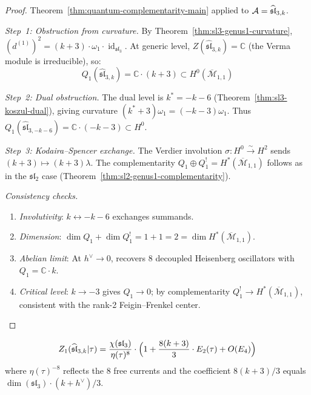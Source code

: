 \begin{proof}
Theorem~\ref{thm:quantum-complementarity-main} applied to $\mathcal{A} = \widehat{\mathfrak{sl}}_{3,k}$.

\emph{Step~1: Obstruction from curvature.}
By Theorem~\ref{thm:sl3-genus1-curvature}, $(d^{(1)})^2 = (k+3) \cdot \omega_1 \cdot \operatorname{id}_{\mathfrak{sl}_3}$.  At generic level, $Z(\widehat{\mathfrak{sl}}_{3,k}) = \mathbb{C}$ (the Verma module is irreducible), so:
\begin{equation}
Q_1(\widehat{\mathfrak{sl}}_{3,k}) = \mathbb{C} \cdot (k+3) \subset H^0(\overline{\mathcal{M}}_{1,1})
\end{equation}

\emph{Step~2: Dual obstruction.}
The dual level is $k^* = -k-6$ (Theorem~\ref{thm:sl3-koszul-dual}), giving curvature $(k^*+3)\omega_1 = (-k-3)\omega_1$.  Thus $Q_1(\widehat{\mathfrak{sl}}_{3,-k-6}) = \mathbb{C}\cdot(-k-3) \subset H^0$.

\emph{Step~3: Kodaira--Spencer exchange.}
The Verdier involution $\sigma\colon H^0 \xrightarrow{\sim} H^2$ sends $(k+3) \mapsto (k+3)\lambda$.  The complementarity $Q_1 \oplus Q_1^! = H^*(\overline{\mathcal{M}}_{1,1})$ follows as in the $\mathfrak{sl}_2$ case (Theorem~\ref{thm:sl2-genus1-complementarity}).

\emph{Consistency checks.}
\begin{enumerate}
\item \emph{Involutivity}: $k \leftrightarrow -k-6$ exchanges summands. \checkmark
\item \emph{Dimension}: $\dim Q_1 + \dim Q_1^! = 1+1 = 2 = \dim H^*(\overline{\mathcal{M}}_{1,1})$. \checkmark
\item \emph{Abelian limit}: At $h^\vee \to 0$, recovers 8 decoupled Heisenberg oscillators with $Q_1 = \mathbb{C}\cdot k$. \checkmark
\item \emph{Critical level}: $k \to -3$ gives $Q_1 \to 0$; by complementarity $Q_1^! \to H^*(\overline{\mathcal{M}}_{1,1})$, consistent with the rank-2 Feigin--Frenkel center. \checkmark
\end{enumerate}
\end{proof}

\begin{proposition}
\label{prop:sl3-genus1-partition}
\begin{equation}\label{eq:sl3-genus1-partition}
Z_1(\widehat{\mathfrak{sl}}_{3,k}|\tau) = \frac{\chi(\mathfrak{sl}_3)}{\eta(\tau)^8} \cdot \Bigl(1 + \frac{8(k+3)}{3} \cdot E_2(\tau) + O(E_4)\Bigr)
\end{equation}
where $\eta(\tau)^{-8}$ reflects the $8$ free currents and the coefficient $8(k+3)/3$ equals $\dim(\mathfrak{sl}_3) \cdot (k+h^\vee)/3$.
\end{proposition}

